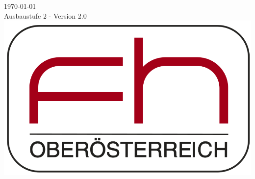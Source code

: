 \documentclass[12pt, letterpaper]{article}
\begin{document}
\begin{titlepage}
{\large \today}\\[1cm] 
{Ausbaustufe 2 -}
{Version 2.0}\\[2cm]


\includegraphics[scale=0.25]{logo.png}
 

\vfill %

\end{titlepage}


\tableofcontents






\end{document}
